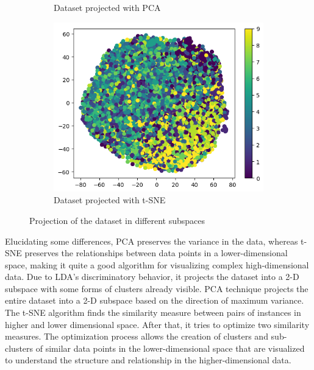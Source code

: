 \documentclass[a4paper]{article}
\theoremstyle{plain}
\theoremstyle{definition}
\begin{document}
{\begin{figure}[h]
\begin{subfigure}{0.32\textwidth}
  \caption {Dataset projected with PCA}
  \label{fig:sub2}
\end{subfigure}
\hfill %
\begin{subfigure}{0.305\textwidth} %
  \centering
  \includegraphics[width=\linewidth]{Figures/tsne.png}
  \captionsetup{font=scriptsize} %
  \caption{Dataset projected with t-SNE}
  \label{fig:sub3}
\end{subfigure}
\caption{Projection of the dataset in different subspaces}
\label{fig:test}
\end{figure}
\noindent
Elucidating some differences, PCA preserves the variance in the data, whereas t-SNE preserves the relationships between data points in a lower-dimensional space, making it quite a good algorithm for visualizing complex high-dimensional data. 
\noindent
Due to LDA's discriminatory behavior, it projects the dataset into a 2-D subspace with some forms of clusters already visible. PCA technique projects the entire dataset into a 2-D subspace based on the direction of maximum variance. The t-SNE algorithm finds the similarity measure between pairs of instances in higher and lower dimensional space. After that, it tries to optimize two similarity measures. The optimization process allows the creation of clusters and sub-clusters of similar data points in the lower-dimensional space that are visualized to understand the structure and relationship in the higher-dimensional data.


}
\end{document}
